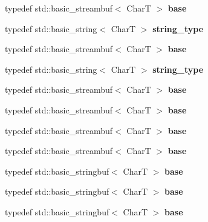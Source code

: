 \begin{DoxyCompactItemize}
typedef std\+::basic\+\_\+streambuf$<$ CharT $>$ {\bfseries base}
\item 
\mbox{\label{structtestbuf_a0576cc53e1f395f08cee680528575b9f}} 
typedef std\+::basic\+\_\+string$<$ CharT $>$ {\bfseries string\+\_\+type}
\item 
\mbox{\label{structtestbuf_a24884ed0e0845a4640bb2b7cbdf60ad6}} 
typedef std\+::basic\+\_\+streambuf$<$ CharT $>$ {\bfseries base}
\item 
\mbox{\label{structtestbuf_a0576cc53e1f395f08cee680528575b9f}} 
typedef std\+::basic\+\_\+string$<$ CharT $>$ {\bfseries string\+\_\+type}
\item 
\mbox{\label{structtestbuf_a24884ed0e0845a4640bb2b7cbdf60ad6}} 
typedef std\+::basic\+\_\+streambuf$<$ CharT $>$ {\bfseries base}
\item 
\mbox{\label{structtestbuf_a24884ed0e0845a4640bb2b7cbdf60ad6}} 
typedef std\+::basic\+\_\+streambuf$<$ CharT $>$ {\bfseries base}
\item 
\mbox{\label{structtestbuf_a24884ed0e0845a4640bb2b7cbdf60ad6}} 
typedef std\+::basic\+\_\+streambuf$<$ CharT $>$ {\bfseries base}
\item 
\mbox{\label{structtestbuf_a24884ed0e0845a4640bb2b7cbdf60ad6}} 
typedef std\+::basic\+\_\+streambuf$<$ CharT $>$ {\bfseries base}
\item 
\mbox{\label{structtestbuf_a298219a2c420b9f6d31fd6125b829d85}} 
typedef std\+::basic\+\_\+stringbuf$<$ CharT $>$ {\bfseries base}
\item 
\mbox{\label{structtestbuf_a298219a2c420b9f6d31fd6125b829d85}} 
typedef std\+::basic\+\_\+stringbuf$<$ CharT $>$ {\bfseries base}
\item 
\mbox{\label{structtestbuf_a298219a2c420b9f6d31fd6125b829d85}} 
typedef std\+::basic\+\_\+stringbuf$<$ CharT $>$ {\bfseries base}
\end{DoxyCompactItemize}
